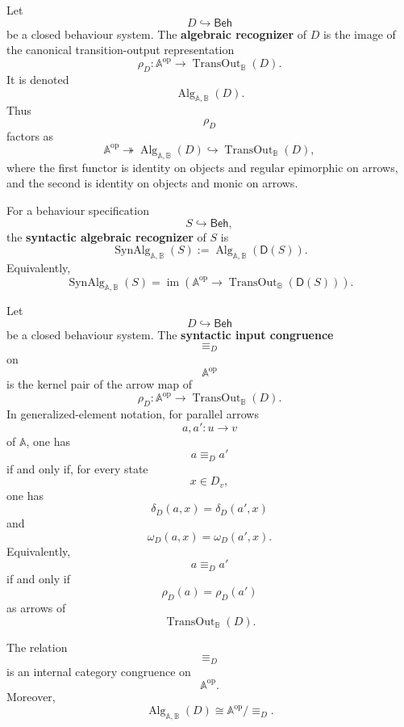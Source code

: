 \begin{definition}
\label{def:eilenberg-alg-D}
Let
\[
D\hookrightarrow\mathsf{Beh}
\]
be a closed behaviour system. The \textbf{algebraic recognizer} of \(D\) is
the image of the canonical transition-output representation
\[
\rho_D:
\mathbb A^{\mathrm{op}}
\to
\operatorname{TransOut}_{\mathbb B}(D).
\]
It is denoted
\[
\operatorname{Alg}_{\mathbb A,\mathbb B}(D).
\]
Thus
\[
\rho_D
\]
factors as
\[
\mathbb A^{\mathrm{op}}
\twoheadrightarrow
\operatorname{Alg}_{\mathbb A,\mathbb B}(D)
\hookrightarrow
\operatorname{TransOut}_{\mathbb B}(D),
\]
where the first functor is identity on objects and regular epimorphic on
arrows, and the second is identity on objects and monic on arrows.
\end{definition}

\begin{definition}
\label{def:eilenberg-synalg}
For a behaviour specification
\[
S\hookrightarrow\mathsf{Beh},
\]
the \textbf{syntactic algebraic recognizer} of \(S\) is
\[
\operatorname{SynAlg}_{\mathbb A,\mathbb B}(S)
:=
\operatorname{Alg}_{\mathbb A,\mathbb B}(\mathsf D(S)).
\]
Equivalently,
\[
\operatorname{SynAlg}_{\mathbb A,\mathbb B}(S)
=
\operatorname{im}
\left(
\mathbb A^{\mathrm{op}}
\to
\operatorname{TransOut}_{\mathbb B}(\mathsf D(S))
\right).
\]
\end{definition}

\begin{definition}
\label{def:eilenberg-syntactic-input-congruence}
Let
\[
D\hookrightarrow\mathsf{Beh}
\]
be a closed behaviour system. The \textbf{syntactic input congruence}
\[
{\equiv_D}
\]
on
\[
\mathbb A^{\mathrm{op}}
\]
is the kernel pair of the arrow map of
\[
\rho_D:
\mathbb A^{\mathrm{op}}
\to
\operatorname{TransOut}_{\mathbb B}(D).
\]
In generalized-element notation, for parallel arrows
\[
a,a':u\to v
\]
of \(\mathbb A\), one has
\[
a\equiv_D a'
\]
if and only if, for every state
\[
x\in D_v,
\]
one has
\[
\delta_D(a,x)=\delta_D(a',x)
\]
and
\[
\omega_D(a,x)=\omega_D(a',x).
\]
Equivalently,
\[
a\equiv_D a'
\]
if and only if
\[
\rho_D(a)=\rho_D(a')
\]
as arrows of
\[
\operatorname{TransOut}_{\mathbb B}(D).
\]
\end{definition}

\begin{proposition}
\label{prop:eilenberg-syntactic-input-congruence}
The relation
\[
{\equiv_D}
\]
is an internal category congruence on
\[
\mathbb A^{\mathrm{op}}.
\]
Moreover,
\[
\operatorname{Alg}_{\mathbb A,\mathbb B}(D)
\cong
\mathbb A^{\mathrm{op}}/{\equiv_D}.
\]
\end{proposition}

